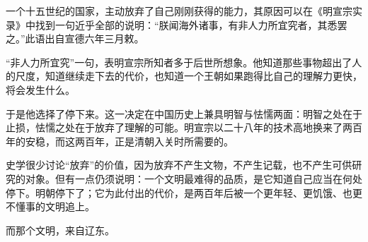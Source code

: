 一个十五世纪的国家，主动放弃了自己刚刚获得的能力，其原因可以在《明宣宗实录》中找到一句近乎全部的说明：“朕闻海外诸事，有非人力所宜究者，其悉罢之。”此语出自宣德六年三月敕。

“非人力所宜究”一句，表明宣宗所知者多于后世所想象。他知道那些事物超出了人的尺度，知道继续走下去的代价，也知道一个王朝如果跑得比自己的理解力更快，将会发生什么。

于是他选择了停下来。这一决定在中国历史上兼具明智与怯懦两面：明智之处在于止损，怯懦之处在于放弃了理解的可能。明宣宗以二十八年的技术高地换来了两百年的安稳，而这两百年，正是清朝入关时所需要的。

史学很少讨论“放弃”的价值，因为放弃不产生文物，不产生记载，也不产生可供研究的对象。但有一点仍须说明：一个文明最难得的品质，是它知道自己应当在何处停下。明朝停下了；它为此付出的代价，是两百年后被一个更年轻、更饥饿、也更不懂事的文明追上。

而那个文明，来自辽东。

